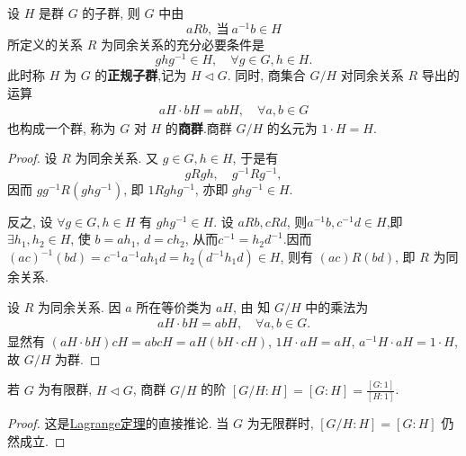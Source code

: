\documentclass[../../main.tex]{subfiles}
\begin{document}
\begin{theorem}\label{theorem:抽象代数-定理 1.3.4}
设 \( H \) 是群 \( G \) 的子群, 则 \( G \) 中由
\[
a R b, \ \text{当} \ a^{-1}b \in H
\]
所定义的关系 \( R \) 为同余关系的充分必要条件是
\[
g h g^{-1} \in H, \quad \forall g \in G, h \in H.
\]
此时称 \( H \) 为 \( G \) 的\textbf{正规子群},记为 \( H \lhd  G \). 
同时, 商集合 \( G/H \) 对同余关系 \( R \) 导出的运算
\begin{align*}
aH \cdot bH = abH, \quad \forall a, b \in G
\end{align*}
也构成一个群, 称为 \( G \) 对 \( H \) 的\textbf{商群}.商群 \( G/H \) 的幺元为 \( 1 \cdot H = H \).
\end{theorem}
\begin{proof}
设 \( R \) 为同余关系. 又 \( g \in G, h \in H \), 于是有
\[
gRgh, \quad g^{-1}Rg^{-1},
\]
因而 \( gg^{-1}R(ghg^{-1}) \), 即 \( 1  R  ghg^{-1} \), 亦即 \( ghg^{-1} \in H \).

反之, 设 \( \forall g \in G, h \in H \) 有 \( ghg^{-1} \in H \). 设 \( a R b, c R d \), 则$a^{-1}b,c^{-1}d\in H$,即 \( \exists h_1, h_2 \in H \), 使 \( b = a h_1 \), \( d = c h_2 \), 从而$c^{-1}=h_2d^{-1}$.因而
\( (ac)^{-1}(bd)=c^{-1}a^{-1}ah_1d=h_2\left( d^{-1}h_1d \right) \in H\), 则有 \( (ac)  R  (bd) \), 即 \( R \) 为同余关系.

设 \( R \) 为同余关系. 因 \( a \) 所在等价类为 \( aH \), 由 知 \( G/H \) 中的乘法为
\begin{align}
aH \cdot bH = abH, \quad \forall a, b \in G. \label{eq:1.3.3}
\end{align}
显然有 \( (aH \cdot bH)cH = abcH = aH(bH \cdot cH) \), \( 1H \cdot aH = aH \), \( a^{-1}H \cdot aH = 1 \cdot H \), 故 \( G/H \) 为群.

\end{proof}

\begin{corollary}\label{corollary:抽象代数-推论 1.3.5}
若 \( G \) 为有限群, \( H \lhd  G \), 商群 \( G/H \) 的阶 \( [G/H : H] = [G : H] = \frac{[G:1]}{[H:1]} \).
\end{corollary}
\begin{proof}
这是\hyperref[theorem:抽象代数-Lagrange定理-定理 1.3.3]{Lagrange定理}的直接推论. 当 \( G \) 为无限群时, \( [G/H : H] = [G : H] \) 仍然成立.

\end{proof}
\textbf{} 
\end{document}
